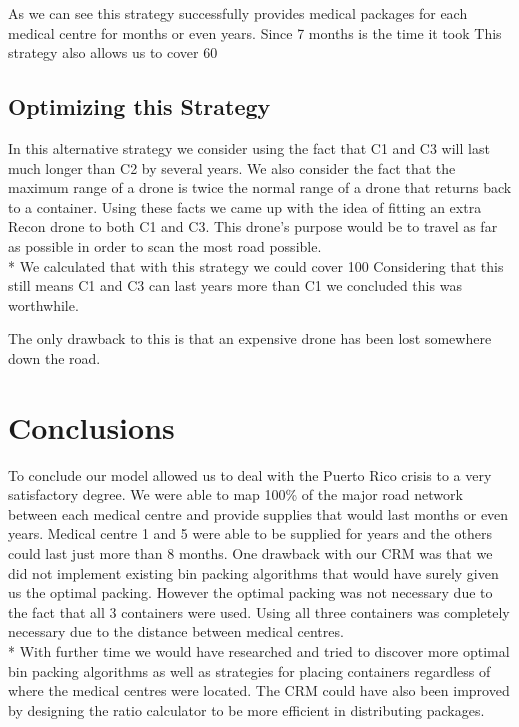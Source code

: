 \documentclass[a4paper,12pt]{article}
\begin{document}
As we can see this strategy successfully provides medical packages for each medical centre for months or even years. Since 7 months is the time it took
This strategy also allows us to cover 60%

\subsection{Optimizing this Strategy}
In this alternative strategy we consider using the fact that C1 and C3 will last much longer than C2 by several years.
We also consider the fact that the maximum range of a drone is twice the normal range of a drone that returns back to a container.
Using these facts we came up with the idea of fitting an extra Recon drone to both C1 and C3. This drone's purpose would be to travel as far as possible
in order to scan the most road possible.\\*
We calculated that with this strategy we could cover 100%
Considering that this still means C1 and C3 can last years more than C1 we concluded this was worthwhile.

The only drawback to this is that an expensive drone has been lost somewhere down the road.



\newpage

\section{Conclusions}
To conclude our model allowed us to deal with the Puerto Rico crisis to a very satisfactory degree. We were able to map 100\% of the major road network between each medical centre and provide supplies that would last
months or even years. Medical centre 1 and 5 were able to be supplied for years and the others could last just more than 8 months.
One drawback with our CRM was that we did not implement existing bin packing algorithms that would have surely given us the optimal packing. However the optimal packing was not necessary due to the fact that all 3 containers were used.
Using all three containers was completely necessary due to the distance between medical centres. \\*
With further time we would have researched and tried to discover more optimal bin packing algorithms as well as strategies for placing containers regardless of where the medical
centres were located. The CRM could have also been improved by designing the ratio calculator to be more efficient in distributing packages.
\end{document}
